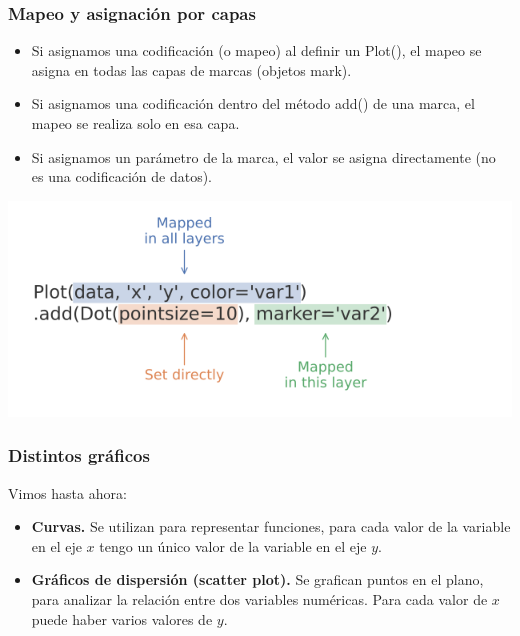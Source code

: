 \documentclass[aspectratio=169,12pt]{beamer}
\begin{document}

\begin{frame}
\frametitle{Mapeo y asignación por capas}

\begin{itemize}
\item Si asignamos una codificación (o mapeo) al definir un Plot(),
el mapeo se asigna en todas las capas de marcas (objetos mark). 
\item Si asignamos una codificación dentro del método add() de una marca, el mapeo se realiza solo en esa capa. 
\item Si asignamos un parámetro de la marca, el valor se asigna directamente (no es una codificación de datos).
\end{itemize}

\begin{center}
\includegraphics[scale=0.40]{practica3-img-mappings.png}
\end{center}

\end{frame}



\begin{frame}
\frametitle{Distintos gráficos}

Vimos hasta ahora:

\begin{itemize}
\item \textbf{Curvas.} Se utilizan para representar funciones, para cada valor de la variable en el eje $x$ tengo un único valor de la variable en el eje $y$.
\item \textbf{Gráficos de dispersión (scatter plot).} Se grafican puntos en el plano, para analizar la relación entre dos variables numéricas. Para cada valor de $x$ puede haber varios valores de $y$.
\end{itemize}

\end{frame}
\end{document}
